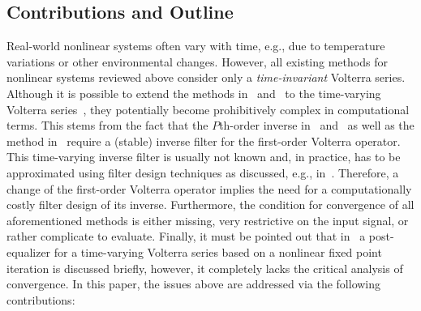 \documentclass[10pt,twocolumn,twoside]{IEEEtran}
\begin{document}
\subsection{Contributions and Outline}
	\label{intro:contrib}

Real-world nonlinear systems often vary with time, e.g., due to
temperature variations or other environmental changes.
However, all existing methods for nonlinear systems reviewed
above consider only a \emph{time-invariant} Volterra series. Although
it is possible to extend the methods in~\cite{schetzen1976,sarti1992} and~\cite{nowak1997} to
the time-varying Volterra series~\cite{soudan2011}, they potentially become prohibitively complex
in computational terms. This stems from the fact that the $P$th-order inverse in~\cite{schetzen1976}
and~\cite{sarti1992} as well as the method in~\cite{nowak1997} require a (stable) inverse filter
for the first-order Volterra operator. This time-varying inverse filter is usually not known and,
in practice, has to be approximated using filter design techniques as discussed, e.g., in~\cite{vogel2012}.
Therefore, a change of the first-order Volterra operator implies the need for a computationally
costly filter design of its inverse.
Furthermore, the condition for convergence of all aforementioned methods is
either missing, very restrictive on the input signal, or rather complicate to
evaluate. Finally, it must be pointed out that in~\cite{soudan2011} a post-equalizer
for a time-varying Volterra series based on a nonlinear fixed point iteration is
discussed briefly, however, it completely lacks the critical analysis of convergence.
In this paper, the issues above are addressed via the following contributions:
\end{document}
